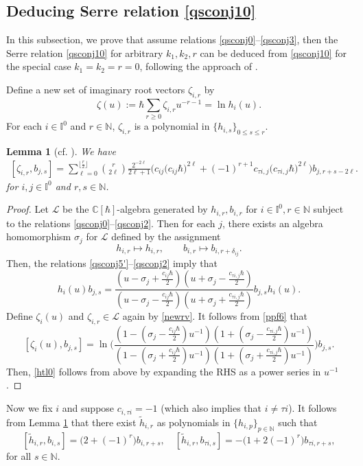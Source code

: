 \documentclass[11pt,reqno]{amsart}
\numberwithin{equation}{section}
\newtheorem{lem}[thm]{Lemma}
\theoremstyle{definition}
\theoremstyle{remark}
\newcommand{\beq}{\begin{equation}}
\newcommand{\eeq}{\end{equation}}
\newcommand{\bN}{\mathbb{N}}
\newcommand{\tl}{\tilde}
\newcommand{\gge}{\geqslant}
\newcommand{\lle}{\leqslant}
\def \h{\hbar}
\def \I{\mathbb{I}}
\def \C{\mathbb{C}}
\begin{document}
\subsection{Deducing Serre relation \eqref{qsconj10}}
\label{sec:qsSerre}

In this subsection, we prove that assume relations \eqref{qsconj0}--\eqref{qsconj3}, then the Serre relation \eqref{qsconj10} for arbitrary $k_1,k_2,r$ can be deduced from \eqref{qsconj10} for the special case $k_1=k_2=r=0$, following the approach of \cite{Le93}.

Define a new set of imaginary root vectors $\zeta_{i,r}$ by
\beq\label{newrv}
\zeta(u):=\h\sum_{r\gge 0} \zeta_{i,r}u^{-r-1}=\ln h_i(u).
\eeq
For each $i\in \I^0$ and $r\in\bN$, $\zeta_{i,r}$ is a polynomial in $\{h_{i,s}\}_{0\lle s\lle r}$.
\begin{lem}[{cf. \cite{Le93,GTL13}}]\label{rvnew}
We have
\beq\label{htl0}
\begin{split}
[\zeta_{i,r},b_{j,s}]=\sum_{\ell=0}^{\lfloor \frac{r}{2}\rfloor} {r \choose 2\ell} \frac{2^{-2\ell}}{2\ell+1}\Big(c_{ij}  \big(c_{ij}\h\big)^{2\ell} +(-1)^{r+1}c_{\tau i,j}  \big(c_{\tau i,j}\h\big)^{2\ell}\Big)b_{j,r+s-2\ell}.
\end{split}
\eeq
for  $i,j\in\I^0$ and $r,s\in\bN$.
\end{lem}
\begin{proof}
Let $\mathscr L$ be the $\C[\h]$-algebra generated by $h_{i,r},b_{i,r}$ for $i\in \I^0,r\in\bN$ subject to the relations \eqref{qsconj0}--\eqref{qsconj2}. Then for each $j$, there exists an algebra homomorphism $\sigma_j$ for $\mathscr L$ defined by the assignment
\[
h_{i,r}\mapsto h_{i,r},\qquad b_{i,r}\mapsto b_{i,r+\delta_{ij}}.
\]
Then, the relations \eqref{qsconj5'}--\eqref{qsconj2} imply that
\beq\label{ppf6}
h_i(u)b_{j,s}=\frac{(u-\sigma_j+\frac{c_{ij}\h}{2})(u+\sigma_j-\frac{c_{\tau i,j}\h}{2})}{(u-\sigma_j-\frac{c_{ij}\h}{2})(u+\sigma_j+\frac{c_{\tau i,j}\h}{2})}b_{j,s}h_i(u).
\eeq
Define $\zeta_i(u)$ and $\zeta_{i,r}\in\mathscr L$ again by \eqref{newrv}. It follows from \eqref{ppf6} that
\[
[\zeta_i(u),b_{j,s}]=\ln\bigg(\frac{(1-(\sigma_j-\frac{c_{ij}\h}{2})u^{-1})(1+(\sigma_j-\frac{c_{\tau i,j}\h}{2})u^{-1})}{(1-(\sigma_j+\frac{c_{ij}\h}{2})u^{-1})(1+(\sigma_j+\frac{c_{\tau i,j}\h}{2})u^{-1})}\bigg)b_{j,s}.
\]
Then, \eqref{htl0} follows from above by expanding the RHS as a power series in $u^{-1}$.
\end{proof}

Now we fix $i$ and suppose $c_{i,\tau i}=-1$ (which also implies that $i\ne \tau i$). It follows from Lemma \ref{rvnew} that there exist $\tl h_{i,r}$ as polynomials in $\{h_{i,p}\}_{p\in\bN}$ such that
\beq\label{htl}
[\tl h_{i,r},b_{i,s}]=\big(2+(-1)^r\big)b_{i,r+s},\quad [\tl h_{i,r},b_{\tau i,s}]=-\big(1+2(-1)^r\big)b_{\tau i,r+s},
\eeq
for all $s\in\bN$.
\end{document}
